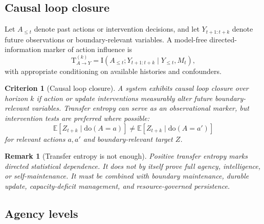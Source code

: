 \documentclass[10pt,a4paper,twocolumn,aps,prl]{revtex4-2}
\newtheorem{criterion}{Criterion}
\newtheorem{remark}{Remark}
\newcommand{\E}{\mathbb{E}}
\newcommand{\MI}{\mathrm{I}}
\newcommand{\TE}{\mathrm{T}}
\newcommand{\doop}{\mathrm{do}}
\begin{document}
\subsection{Causal loop closure}

Let $A_{\leq t}$ denote past actions or intervention decisions, and let $Y_{t+1:t+k}$ denote future observations or boundary-relevant variables. A model-free directed-information marker of action influence is
\begin{equation}
\TE_{A\to Y}^{(k)}=\MI(A_{\leq t};Y_{t+1:t+k}\mid Y_{\leq t},M_t),
\label{eq:transfer-entropy}
\end{equation}
with appropriate conditioning on available histories and confounders.

\begin{criterion}[Causal loop closure]
A system exhibits causal loop closure over horizon $k$ if action or update interventions measurably alter future boundary-relevant variables. Transfer entropy can serve as an observational marker, but intervention tests are preferred where possible:
\begin{equation}
\E[Z_{t+k}\mid \doop(A=a)]\neq \E[Z_{t+k}\mid \doop(A=a')]
\end{equation}
for relevant actions $a,a'$ and boundary-relevant target $Z$.
\end{criterion}

\begin{remark}[Transfer entropy is not enough]
Positive transfer entropy marks directed statistical dependence. It does not by itself prove full agency, intelligence, or self-maintenance. It must be combined with boundary maintenance, durable update, capacity-deficit management, and resource-governed persistence.
\end{remark}

\subsection{Agency levels}
\end{document}
